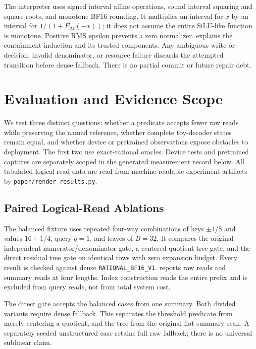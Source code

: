 \documentclass{article}
\theoremstyle{plain}
\theoremstyle{definition}
\theoremstyle{remark}
\newcommand{\E}{E_{24}}
\newcommand{\profile}{\texttt{RATIONAL\_BF16\_V1}}
\newcommand{\code}[1]{\texttt{\small #1}}
\begin{document}
The interpreter uses signed interval affine operations, sound interval
squaring and square roots, and monotone BF16 rounding. It multiplies an
interval for $x$ by an interval for $1/(1+\E(-x))$; it does not assume
the entire SiLU-like function is monotone. Positive RMS epsilon prevents a
zero normalizer.  explains the containment induction
and its trusted components. Any ambiguous write or decision, invalid
denominator, or resource failure discards the attempted transition before
dense fallback. There is no partial commit or future repair debt.

\section{Evaluation and Evidence Scope}
\label{sec:evaluation}

We test three distinct questions: whether a predicate accepts fewer raw
reads while preserving the named reference, whether complete toy-decoder
states remain equal, and whether device or pretrained observations expose
obstacles to deployment. The first two use exact-rational oracles. Device
tests and pretrained captures are separately scoped in the generated
measurement record below. All tabulated logical-read data are read from
machine-readable experiment artifacts by \code{paper/render\_results.py}.

\subsection{Paired Logical-Read Ablations}

The balanced fixture uses repeated four-way combinations of keys
$\pm1/8$ and values $16\pm1/4$, query $q=1$, and leaves of $B=32$.
It compares the original independent numerator/denominator gate, a
centered-quotient tree gate, and the direct residual tree gate on identical
rows with zero expansion budget. Every result is checked against dense
\profile{}.  reports raw reads and summary reads at
four lengths. Index construction reads the entire prefix and is excluded
from query reads, not from total system cost.



The direct gate accepts the balanced cases from one summary. Both divided
variants require dense fallback. This separates the threshold predicate
from merely centering a quotient, and the tree from the original flat
summary scan. A separately seeded unstructured case retains full raw
fallback; there is no universal sublinear claim.
\end{document}
